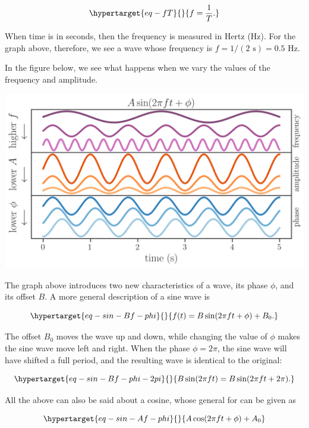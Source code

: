\documentclass[
  letterpaper,
  DIV=11,
  numbers=noendperiod,
  oneside]{scrreprt}
\begin{document}
\begin{equation}\protect\hypertarget{eq-fT}{}{
f = \frac{1}{T}.
}\label{eq-fT}\end{equation}

When time is in seconds, then the frequency is measured in Hertz (Hz).
For the graph above, therefore, we see a wave whose frequency is
\(f = 1/(2 \text{ s}) = 0.5\) Hz.

In the figure below, we see what happens when we vary the values of the
frequency and amplitude.

\includegraphics{frequency/sine2.png}

The graph above introduces two new characteristics of a wave, its phase
\(\phi\), and its offset \(B\). A more general description of a sine
wave is

\begin{equation}\protect\hypertarget{eq-sin-Bf-phi}{}{
f(t) = B\sin(2\pi f t + \phi) + B_0.
}\label{eq-sin-Bf-phi}\end{equation}

The offset \(B_0\) moves the wave up and down, while changing the value
of \(\phi\) makes the sine wave move left and right. When the phase
\(\phi=2\pi\), the sine wave will have shifted a full period, and the
resulting wave is identical to the original:

\begin{equation}\protect\hypertarget{eq-sin-Bf-phi-2pi}{}{
B\sin(2\pi f t) = B\sin(2\pi f t + 2\pi).
}\label{eq-sin-Bf-phi-2pi}\end{equation}

All the above can also be said about a cosine, whose general for can be
given as

\begin{equation}\protect\hypertarget{eq-sin-Af-phi}{}{
A\cos(2\pi f t + \phi) + A_0
}\label{eq-sin-Af-phi}\end{equation}
\end{document}
